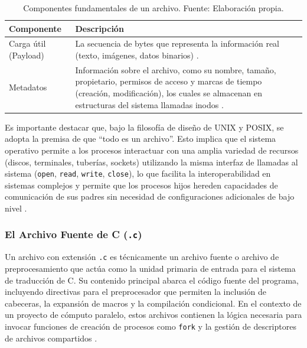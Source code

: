 \begin{table}[H]
\centering
\begin{tabular}{|p{3cm}|p{10cm}|}
\hline
\textbf{Componente} & \textbf{Descripción} \\
\hline
Carga útil (Payload) & La secuencia de bytes que representa la información real (texto, imágenes, datos binarios) \cite{stanford_cs111}. \\
\hline
Metadatos & Información sobre el archivo, como su nombre, tamaño, propietario, permisos de acceso y marcas de tiempo (creación, modificación), los cuales se almacenan en estructuras del sistema llamadas inodos \cite{mit_6828, berkeley_cs162}. \\
\hline
\end{tabular}
\caption{Componentes fundamentales de un archivo. Fuente: Elaboración propia.}
\label{tab:componentes_archivo}
\end{table}

Es importante destacar que, bajo la filosofía de diseño de UNIX y POSIX, se adopta la premisa de que \enquote{todo es un archivo}. Esto implica que el sistema operativo permite a los procesos interactuar con una amplia variedad de recursos (discos, terminales, tuberías, sockets) utilizando la misma interfaz de llamadas al sistema (\texttt{open}, \texttt{read}, \texttt{write}, \texttt{close}), lo que facilita la interoperabilidad en sistemas complejos y permite que los procesos hijos hereden capacidades de comunicación de sus padres sin necesidad de configuraciones adicionales de bajo nivel \cite{ieee2017posix, linux_man}.

\subsubsection{El Archivo Fuente de C (\texttt{.c})}

Un archivo con extensión \texttt{.c} es técnicamente un archivo fuente o archivo de preprocesamiento que actúa como la unidad primaria de entrada para el sistema de traducción de C. Su contenido principal abarca el código fuente del programa, incluyendo directivas para el preprocesador que permiten la inclusión de cabeceras, la expansión de macros y la compilación condicional. En el contexto de un proyecto de cómputo paralelo, estos archivos contienen la lógica necesaria para invocar funciones de creación de procesos como \texttt{fork} y la gestión de descriptores de archivos compartidos \cite{wiki_translation_unit, iso2024c}.

